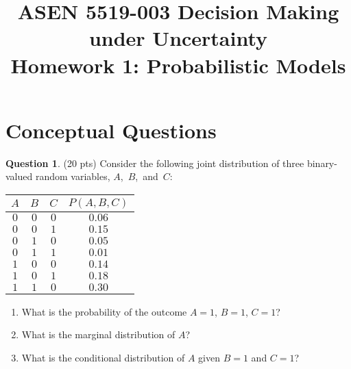 \documentclass{article}
\title{ASEN 5519-003 Decision Making under Uncertainty\\
       Homework 1: Probabilistic Models}
\theoremstyle{definition}
\newtheorem{question}[thm]{Question}
\begin{document}
\maketitle

\section{Conceptual Questions}

\begin{question} (20 pts)
    Consider the following joint distribution of three binary-valued random variables, \mbox{$A$, $B$, and $C$}:

    \begin{minipage}{0.23\linewidth}
        \vspace{1em}
    {\tiny
    \begin{tabular}{cccc}
        \toprule
            $A$ & $B$ & $C$ & $P(A,B,C)$ \\
        \midrule
            $0$ & $0$ & $0$ & $0.06$ \\
            $0$ & $0$ & $1$ & $0.15$ \\
            $0$ & $1$ & $0$ & $0.05$ \\
            $0$ & $1$ & $1$ & $0.01$ \\
            $1$ & $0$ & $0$ & $0.14$ \\
            $1$ & $0$ & $1$ & $0.18$ \\
            $1$ & $1$ & $0$ & $0.30$ \\
        \bottomrule
    \end{tabular}
    }
    \end{minipage}
    \begin{minipage}{0.75\linewidth}
        \begin{enumerate}[label=\alph*)]
            \item What is the probability of the outcome $A=1$, $B=1$, $C=1$?
            \item What is the marginal distribution of $A$?
            \item What is the conditional distribution of $A$ given $B=1$ and $C=1$?
        \end{enumerate}
    \end{minipage}
\end{question}
\end{document}
